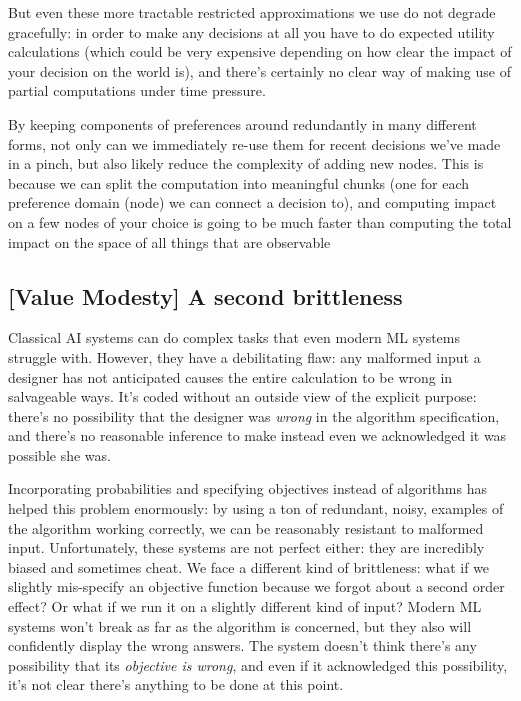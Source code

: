 \documentclass{article}
\begin{document}
	But even these more tractable restricted approximations we use do not degrade gracefully: in order to make any decisions at all you have to do expected utility calculations (which could be very expensive depending on how clear the impact of your decision on the world is), and there's certainly no clear way of making use of partial computations under time pressure.
	
	{\color{green!30!black} By keeping components of preferences around redundantly in many different forms, not only can we immediately re-use them for recent decisions we've made in a pinch, but also likely reduce the complexity of adding new nodes. This is because we can split the computation into meaningful chunks (one for each preference domain (node) we can connect a decision to), and computing impact on a few nodes of your choice is going to be much faster than computing the total impact on the space of all things that are observable}
	
	\subsection*{[Value Modesty] A second brittleness}
	Classical AI systems can do complex tasks that even modern ML systems struggle with. However, they have a debilitating flaw: any malformed input a designer has not anticipated causes the entire calculation to be wrong in salvageable ways. It's coded without an outside view of the explicit purpose: there's no possibility that the designer was \textit{wrong} in the algorithm specification, and there's no reasonable inference to make instead even we acknowledged it was possible she was.
	
	Incorporating probabilities and specifying objectives instead of algorithms has helped this problem enormously: by using a ton of redundant, noisy, examples of the algorithm working correctly, we can be reasonably resistant to malformed input. Unfortunately, these systems are not perfect either: they are incredibly biased and sometimes cheat. We face a different kind of brittleness: what if we slightly mis-specify an objective function because we forgot about a second order effect? Or what if we run it on a slightly different kind of input? Modern ML systems won't break as far as the algorithm is concerned, but they also will confidently display the wrong answers. The system doesn't think there's any possibility that its \textit{objective is wrong}, and even if it acknowledged this possibility, it's not clear there's anything to be done at this point.
	
\end{document}
